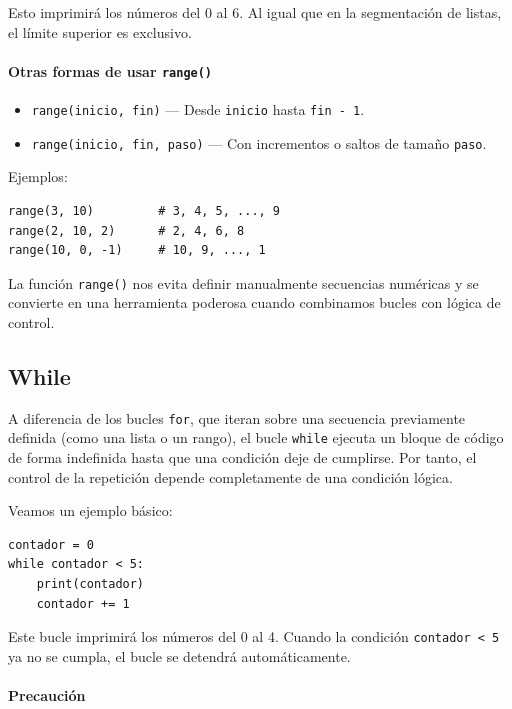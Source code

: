 \documentclass{article}
\theoremstyle{nonumberplain}
\begin{document}
Esto imprimirá los números del 0 al 6. Al igual que en la segmentación de listas, el límite superior es exclusivo.

\paragraph{Otras formas de usar \texttt{range()}}

\begin{itemize}
    \item \texttt{range(inicio, fin)} — Desde \texttt{inicio} hasta \texttt{fin - 1}.
    \item \texttt{range(inicio, fin, paso)} — Con incrementos o saltos de tamaño \texttt{paso}.
\end{itemize}

Ejemplos:

\begin{verbatim}
range(3, 10)         # 3, 4, 5, ..., 9
range(2, 10, 2)      # 2, 4, 6, 8
range(10, 0, -1)     # 10, 9, ..., 1
\end{verbatim}

La función \texttt{range()} nos evita definir manualmente secuencias numéricas y se convierte en una herramienta poderosa cuando combinamos bucles con lógica de control.

\subsection*{While}

A diferencia de los bucles \texttt{for}, que iteran sobre una secuencia previamente definida (como una lista o un rango), el bucle \texttt{while} ejecuta un bloque de código de forma indefinida hasta que una condición deje de cumplirse. Por tanto, el control de la repetición depende completamente de una condición lógica.

Veamos un ejemplo básico:

\begin{verbatim}
contador = 0
while contador < 5:
    print(contador)
    contador += 1
\end{verbatim}

Este bucle imprimirá los números del 0 al 4. Cuando la condición \texttt{contador < 5} ya no se cumpla, el bucle se detendrá automáticamente.

\paragraph{Precaución}
\end{document}
